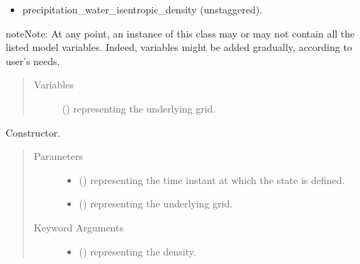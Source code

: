\documentclass[letterpaper,10pt,english]{sphinxmanual}
\begin{document}
\begin{fulllineitems}
\begin{itemize}
\item {} 
precipitation\_water\_isentropic\_density (unstaggered).

\end{itemize}

\begin{sphinxadmonition}{note}{Note:}
At any point, an instance of this class may or may not contain all the listed model variables. Indeed, variables
might be added gradually, according to user’s needs.
\end{sphinxadmonition}
\begin{quote}\begin{description}
\item[{Variables}] \leavevmode
{} () \textendash{} {\hyperref[\detokenize{api:grids.grid_xyz.GridXYZ}]{}} representing the underlying grid.

\end{description}\end{quote}

\begin{fulllineitems}
\label{\detokenize{api:storages.state_isentropic.StateIsentropic.__init__}}
Constructor.
\begin{quote}\begin{description}
\item[{Parameters}] \leavevmode\begin{itemize}
\item {} 
 () \textendash{}  representing the time instant at which the state is defined.

\item {} 
 () \textendash{} {\hyperref[\detokenize{api:grids.grid_xyz.GridXYZ}]{}} representing the underlying grid.

\end{itemize}

\item[{Keyword Arguments}] \leavevmode\begin{itemize}
\item {} 
 () \textendash{}  representing the density.


\end{itemize}
\end{description}
\end{quote}
\end{fulllineitems}
\end{fulllineitems}
\end{document}
